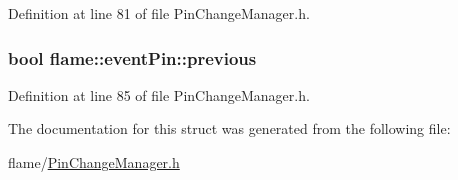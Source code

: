 Definition at line 81 of file Pin\-Change\-Manager.\-h.

\hypertarget{structflame_1_1event_pin_a2681b74d7415d069d0da214d25575fdb}{
\subsubsection[{previous}]{\setlength{\rightskip}{0pt plus 5cm}bool flame\-::event\-Pin\-::previous}}\label{structflame_1_1event_pin_a2681b74d7415d069d0da214d25575fdb}


Definition at line 85 of file Pin\-Change\-Manager.\-h.



The documentation for this struct was generated from the following file\-:\begin{DoxyCompactItemize}
\item 
flame/\hyperlink{_pin_change_manager_8h}{Pin\-Change\-Manager.\-h}\end{DoxyCompactItemize}
